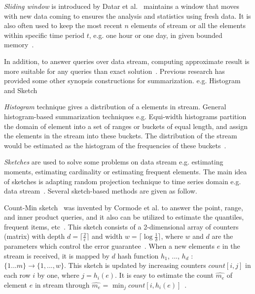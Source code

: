 \emph{Sliding window} is introduced by Datar et
al.~\cite{datar2002maintaining} maintains a window that moves with new data
coming to ensures the analysis and statistics using fresh data. It is also often
used to keep the most recent $n$ elements of stream or all the elements within
specific time period $t$, e.g. one hour or one day, in given bounded
memory~\cite{leskovec2014mining}.


In addition, to answer queries over data stream, computing approximate result is
more suitable for any queries than exact solution~\cite{kejariwal2015real}.
Previous research has provided some other synopsis constructions for
summarization. e.g. Histogram~\cite{hesabi2015data, poosala1999approximate} and
Sketch~\cite{flajolet1985probabilistic, alon1999space,
cormode2005improved,shan2016lru}

\emph{Histogram} technique gives a distribution of a elements in stream. General
histogram-based summarization techniques e.g. Equi-width histograms partition
the domain of element into a set of ranges or buckets of equal length, and
assign the elements in the stream into these buckets. The distribution of the
stream would be estimated as the histogram of the frequencies of these
buckets~\cite{kejariwal2015real, ahmed2019data}.

\emph{Sketches} are used to solve some problems on data stream e.g. estimating
moments, estimating cardinality or estimating frequent elements. The main idea
of sketches is adapting random projection technique to time series domain e.g.
data stream~\cite{ahmed2019data}. Several sketch-based methods are given as
follow.

Count-Min sketch~\cite{cormode2005improved} was invented by Cormode et al. to
answer the point, range, and inner product queries, and it also can be utilized
to estimate the quantiles, frequent items, etc~\cite{cormode2005improved}. This
sketch consists of a 2-dimensional array of counters (matrix) with depth $d=
\lceil \frac{2}{\epsilon} \rceil$ and width $w= \lceil
\log\frac{1}{\delta}\rceil$, where $w$ and $d$ are the parameters which control
the error guarantee~\cite{garofalakis2016data}. When a new elements $e$ in the
stream is received, it is mapped by $d$ hash function $h_1$, ..., $h_d$ :
$\{1...m\}\rightarrow \{1, ..., w\}$. This sketch is updated by increasing
counters $count[i, j]$ in each row $i$ by one, where $j = h_{i}(e)$. It is easy
to estimate the count $\hat{m_e}$ of element $e$ in stream through $\hat{m_e}$ =
$\min_j count[i, h_{i}(e)]$~\cite{garofalakis2016data}.

